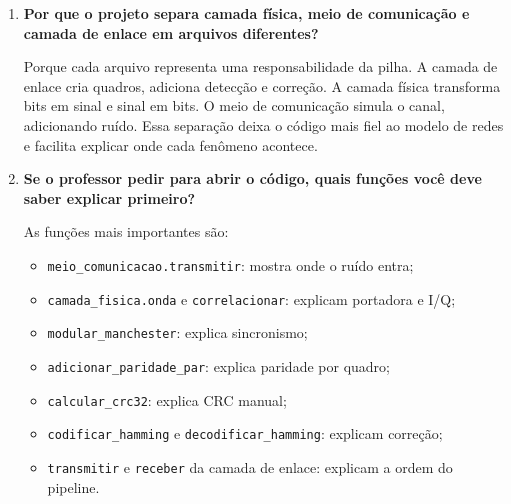 \documentclass[11pt,a4paper]{article}
\newcommand{\rank}[1]{\textcolor{rankblue}{\textbf{Rank #1}}}
\begin{document}
\begin{enumerate}[leftmargin=1.2cm, itemsep=8pt]
  \item[\rank{19}.] \textbf{Por que o projeto separa camada física, meio de comunicação e camada de enlace em arquivos diferentes?}

  Porque cada arquivo representa uma responsabilidade da pilha. A camada de enlace cria quadros, adiciona detecção e correção. A camada física transforma bits em sinal e sinal em bits. O meio de comunicação simula o canal, adicionando ruído. Essa separação deixa o código mais fiel ao modelo de redes e facilita explicar onde cada fenômeno acontece.

  \item[\rank{20}.] \textbf{Se o professor pedir para abrir o código, quais funções você deve saber explicar primeiro?}

  As funções mais importantes são:

  \begin{itemize}
    \item \texttt{meio\_comunicacao.transmitir}: mostra onde o ruído entra;
    \item \texttt{camada\_fisica.onda} e \texttt{correlacionar}: explicam portadora e I/Q;
    \item \texttt{modular\_manchester}: explica sincronismo;
    \item \texttt{adicionar\_paridade\_par}: explica paridade por quadro;
    \item \texttt{calcular\_crc32}: explica CRC manual;
    \item \texttt{codificar\_hamming} e \texttt{decodificar\_hamming}: explicam correção;
    \item \texttt{transmitir} e \texttt{receber} da camada de enlace: explicam a ordem do pipeline.
  \end{itemize}
\end{enumerate}
\end{document}

